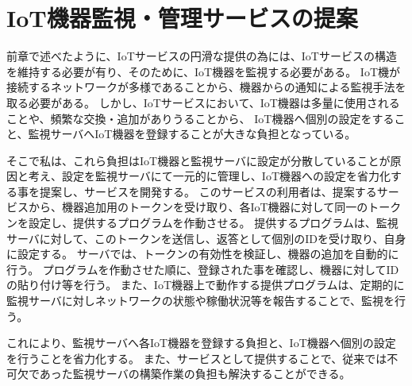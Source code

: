 \section{IoT機器監視・管理サービスの提案}
前章で述べたように、IoTサービスの円滑な提供の為には、IoTサービスの構造を維持する必要が有り、そのために、IoT機器を監視する必要がある。
IoT機が接続するネットワークが多様であることから、機器からの通知による監視手法を取る必要がある。
しかし、IoTサービスにおいて、IoT機器は多量に使用されることや、頻繁な交換・追加がありうることから、
IoT機器へ個別の設定をすること、監視サーバへIoT機器を登録することが大きな負担となっている。

そこで私は、これら負担はIoT機器と監視サーバに設定が分散していることが原因と考え、設定を監視サーバにて一元的に管理し、IoT機器への設定を省力化する事を提案し、サービスを開発する。
このサービスの利用者は、提案するサービスから、機器追加用のトークンを受け取り、各IoT機器に対して同一のトークンを設定し、提供するプログラムを作動させる。
提供するプログラムは、監視サーバに対して、このトークンを送信し、返答として個別のIDを受け取り、自身に設定する。
サーバでは、トークンの有効性を検証し、機器の追加を自動的に行う。
プログラムを作動させた順に、登録された事を確認し、機器に対してIDの貼り付け等を行う。
また、IoT機器上で動作する提供プログラムは、定期的に監視サーバに対しネットワークの状態や稼働状況等を報告することで、監視を行う。

これにより、監視サーバへ各IoT機器を登録する負担と、IoT機器へ個別の設定を行うことを省力化する。
また、サービスとして提供することで、従来では不可欠であった監視サーバの構築作業の負担も解決することができる。




\begin{comment}

IoT機器からの通知に基づいた、設定不要の独立した状態監視のためのサービスを提案する。
機器から通知を送ることで、IoT機器の接続されるネットワークが、プライベートアドレスを使用していても監視可能であること、ネットワークが違っていても一つの画面で確認できることを満たす。
また、状態監視の為のサービスを独立させることで、IoTサービスの変更が不要であることや、監視サーバを立てる必要が無いことを満たす。
IoT機器への設定の必要性については、あらかじめ、IoT機器自体に存在する識別IDを用いることとする。
こうすることで、監視サーバに対して、設定をする必要がなくなる。



このように、今後使用するIoT機器が増えていくことを考えると、現状の手動での監視は負担となる。
そこで、新規にIoT機器の監視に汎用的に使用できるシステムを開発し、サービスとして提供することで、問題の解決が図れるのではないかと考えた。
実験と聞き取りから得られた要件を以下にまとめる。
\begin{itemize}
\item 機器が起動し動作していることが確認できること
\item CPUの温度等も確認できると良い
\item 各機器に対する監視に関わる設定の簡略化もできたら良い
\item 機器の異常をメールなどで知らせることができたら良い
\item 機器の状態をIoTサービスごとに管理したい
\end{itemize}
\end{comment}

